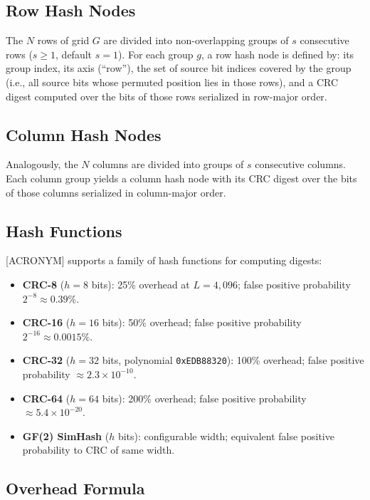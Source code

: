 \subsection{Row Hash Nodes}

The $N$ rows of grid $G$ are divided into non-overlapping groups of $s$ consecutive rows ($s \geq 1$, default $s = 1$). For each group $g$, a row hash node is defined by: its group index, its axis (``row''), the set of source bit indices covered by the group (i.e., all source bits whose permuted position lies in those rows), and a CRC digest computed over the bits of those rows serialized in row-major order.

\subsection{Column Hash Nodes}

Analogously, the $N$ columns are divided into groups of $s$ consecutive columns. Each column group yields a column hash node with its CRC digest over the bits of those columns serialized in column-major order.

\subsection{Hash Functions}

[ACRONYM] supports a family of hash functions for computing digests:

\begin{itemize}
    \item \textbf{CRC-8} ($h=8$ bits): 25\% overhead at $L=4{,}096$; false positive probability $2^{-8} \approx 0.39\%$.
    \item \textbf{CRC-16} ($h=16$ bits): 50\% overhead; false positive probability $2^{-16} \approx 0.0015\%$.
    \item \textbf{CRC-32} ($h=32$ bits, polynomial \texttt{0xEDB88320}): 100\% overhead; false positive probability $\approx 2.3 \times 10^{-10}$.
    \item \textbf{CRC-64} ($h=64$ bits): 200\% overhead; false positive probability $\approx 5.4 \times 10^{-20}$.
    \item \textbf{GF(2) SimHash} ($h$ bits): configurable width; equivalent false positive probability to CRC of same width.
\end{itemize}

\subsection{Overhead Formula}

